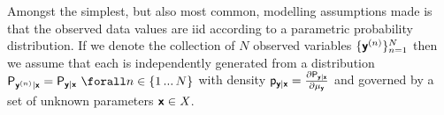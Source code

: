 Amongst the simplest, but also most common, modelling assumptions made is that the observed data values are \ac{iid} according to a parametric probability distribution. If we denote the collection of $N$ observed variables $\lbrace \boldsymbol{\mathsf{y}}^{(n)} \rbrace_{n=1}^N$ then we assume that each is independently generated from a distribution $\prob{\rvct{y}^{(n)}|\rvct{x}} = \prob{\rvct{y}|\rvct{x}} ~\forall n \in \lbrace 1 \,...\,N\rbrace$ with density $\mathsf{p}_{\boldsymbol{\mathsf{y}}|\boldsymbol{\mathsf{x}}} = \frac{\partial \mathsf{P}_{\boldsymbol{\mathsf{y}}|\boldsymbol{\mathsf{x}}}}{\partial \mu_{\boldsymbol{\mathsf{y}}}}$ and governed by a set of unknown parameters $\boldsymbol{\mathsf{x}} \in \mathit{X}$. %

